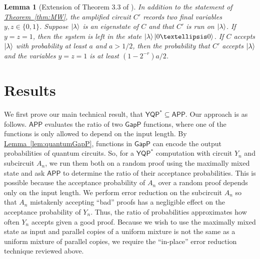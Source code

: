 \documentclass[11pt]{article}
\numberwithin{equation}{section}
\newtheorem{lemma}[theorem]{Lemma}
\theoremstyle{definition}
\theoremstyle{plain}
\newcommand{\expref}[2]{\hyperref[#2]{#1~\ref{#2}}}
\newcommand{\class}[1]{\ensuremath{\mathsf{#1}}\xspace}
\newcommand{\GapP}{\class{GapP}}
\newcommand{\YQPstar}{\class{YQP^*}}
\newcommand{\APP}{\class{APP}}
\begin{document}
\begin{lemma}[Extension of Theorem 3.3 of \cite{marriott2005quantum}]\label{lem:MW2}
	In addition to the statement of \expref{Theorem}{thm:MW},
	the amplified circuit
	$C'$ records two final variables $y,z\in \{0,1\}$.
	Suppose $\ket{\lambda}$ is an eigenstate of $C$
	and that
	$C'$ is run on $\ket{\lambda}$.
	If
	$y=z=1$,
	then the system is left in the state $\ket{\lambda}\ket{0\dots 0}$.
	If $C$ accepts $\ket{\lambda}$ with probability at least $a$ and $a > 1/2$,
	then the probability that $C'$ accepts $\ket{\lambda}$ and the variables $y=z=1$ is at least $\left(1-2^{-r}\right) a /2$.
\end{lemma}


%
\section{Results}

We first prove our main technical result, that $\YQPstar\subseteq \APP$.
Our approach is as follows.
$\APP$ evaluates the ratio of two $\GapP$ functions, where one of the functions
is only allowed to depend on the input length. By \expref{Lemma}{lem:quantumGapP}, functions
in $\GapP$ can encode the output probabilities of quantum circuits.
So, for a $\YQPstar$ computation with circuit $Y_n$ and subcircuit $A_n$,
we run them both on a random proof using the maximally mixed state
and ask $\APP$ to determine the ratio of their acceptance probabilities.
This is possible because the acceptance probability of $A_n$ over a random proof
depends only on the input length.
We perform error reduction on the subcircuit $A_n$ so that
$A_n$ mistakenly accepting ``bad'' proofs has a negligible effect on the acceptance probability of $Y_n$.
Thus, the ratio of probabilities approximates how often
$Y_n$ accepts given a good proof.
Because we wish to use the maximally mixed state as input
and parallel copies of a uniform mixture
is not the same as a uniform mixture of parallel copies,
we require the ``in-place'' error reduction technique reviewed above.
\end{document}
